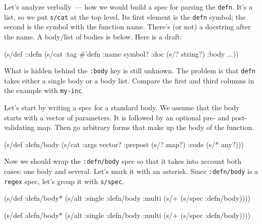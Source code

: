 Let's analyze verbally~--- how we would build a spec for parsing the \verb|defn|. It's a list, so we put \verb|s/cat| at the top level. Its first element is the \verb|defn| symbol; the second is the symbol with the function name. There's (or not) a docstring after the name. A body/list of bodies is below. Here is a draft:

\begin{english}
  \begin{clojure}
(s/def ::defn
  (s/cat :tag #{'defn}
         :name symbol?
         :doc (s/? string?)
         :body ...))
  \end{clojure}
\end{english}

What is hidden behind the \verb|:body| key is still unknown. The problem is that \verb|defn| takes either a single body or a body list. Compare the first and third columns in the example with \verb|my-inc|.

Let's start by writing a spec for a standard body. We assume that the body starts with a vector of parameters. It is followed by an optional pre- and post-validating map. Then go arbitrary forms that make up the body of the function.

\begin{english}
  \begin{clojure}
(s/def :defn/body
  (s/cat :args vector?
         :prepost (s/? map?)
         :code (s/* any?)))
  \end{clojure}
\end{english}

Now we should wrap the \verb|:defn/body| spec so that it takes into account both cases: one body and several. Let's mark it with an asterisk. Since \verb|:defn/body| is a \verb|regex| spec, let's group it with \verb|s/spec|.

\ifx\DEVICETYPE\MOBILE

\begin{english}
  \begin{clojure}
(s/def :defn/body*
  (s/alt :single :defn/body
         :multi (s/+
                  (s/spec :defn/body))))
  \end{clojure}
\end{english}

\else

\begin{english}
  \begin{clojure}
(s/def :defn/body*
  (s/alt :single :defn/body
         :multi (s/+ (s/spec :defn/body))))
  \end{clojure}
\end{english}

